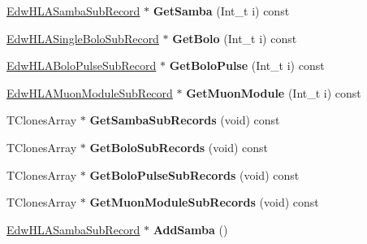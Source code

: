 \begin{DoxyCompactItemize}
\item 
\hypertarget{class_edw_h_l_a_event_abce0fb4bb21186f7af64ce0f73fc66e0}{
\hyperlink{class_edw_h_l_a_samba_sub_record}{EdwHLASambaSubRecord} $\ast$ {\bfseries GetSamba} (Int\_\-t i) const }
\label{class_edw_h_l_a_event_abce0fb4bb21186f7af64ce0f73fc66e0}

\item 
\hypertarget{class_edw_h_l_a_event_a415cb46b04eebf5ea0aa368431ef23b4}{
\hyperlink{class_edw_h_l_a_single_bolo_sub_record}{EdwHLASingleBoloSubRecord} $\ast$ {\bfseries GetBolo} (Int\_\-t i) const }
\label{class_edw_h_l_a_event_a415cb46b04eebf5ea0aa368431ef23b4}

\item 
\hypertarget{class_edw_h_l_a_event_ac8137ae08c68ad1f9028fff76d4fba00}{
\hyperlink{class_edw_h_l_a_bolo_pulse_sub_record}{EdwHLABoloPulseSubRecord} $\ast$ {\bfseries GetBoloPulse} (Int\_\-t i) const }
\label{class_edw_h_l_a_event_ac8137ae08c68ad1f9028fff76d4fba00}

\item 
\hypertarget{class_edw_h_l_a_event_a602756705bb5795753027b0bca7da371}{
\hyperlink{class_edw_h_l_a_muon_module_sub_record}{EdwHLAMuonModuleSubRecord} $\ast$ {\bfseries GetMuonModule} (Int\_\-t i) const }
\label{class_edw_h_l_a_event_a602756705bb5795753027b0bca7da371}

\item 
\hypertarget{class_edw_h_l_a_event_a399e2aed808c63ae1796136a1ab42a96}{
TClonesArray $\ast$ {\bfseries GetSambaSubRecords} (void) const }
\label{class_edw_h_l_a_event_a399e2aed808c63ae1796136a1ab42a96}

\item 
\hypertarget{class_edw_h_l_a_event_a668a15575ffdcd11155b2d29b3481135}{
TClonesArray $\ast$ {\bfseries GetBoloSubRecords} (void) const }
\label{class_edw_h_l_a_event_a668a15575ffdcd11155b2d29b3481135}

\item 
\hypertarget{class_edw_h_l_a_event_a19606a9ec3362999b0f01a99bf7f5483}{
TClonesArray $\ast$ {\bfseries GetBoloPulseSubRecords} (void) const }
\label{class_edw_h_l_a_event_a19606a9ec3362999b0f01a99bf7f5483}

\item 
\hypertarget{class_edw_h_l_a_event_a397df1762598d55b5c714484c7a9ea30}{
TClonesArray $\ast$ {\bfseries GetMuonModuleSubRecords} (void) const }
\label{class_edw_h_l_a_event_a397df1762598d55b5c714484c7a9ea30}

\item 
\hypertarget{class_edw_h_l_a_event_a92596fe018d6cc3a64ecdd07e34d101f}{
\hyperlink{class_edw_h_l_a_samba_sub_record}{EdwHLASambaSubRecord} $\ast$ {\bfseries AddSamba} ()}
\label{class_edw_h_l_a_event_a92596fe018d6cc3a64ecdd07e34d101f}


\end{DoxyCompactItemize}
